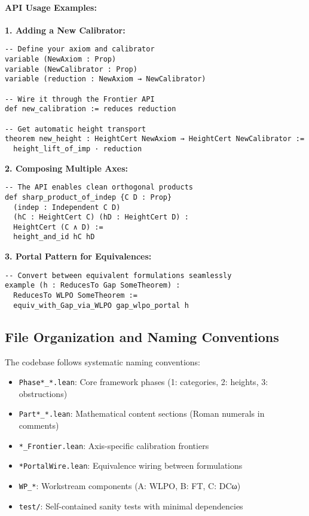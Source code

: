 \documentclass[11pt]{article}
\theoremstyle{plain}
\theoremstyle{definition}
\begin{document}
\paragraph{API Usage Examples:}

\textbf{1. Adding a New Calibrator:}
\begin{verbatim}
-- Define your axiom and calibrator
variable (NewAxiom : Prop)
variable (NewCalibrator : Prop)
variable (reduction : NewAxiom → NewCalibrator)

-- Wire it through the Frontier API
def new_calibration := reduces reduction

-- Get automatic height transport
theorem new_height : HeightCert NewAxiom → HeightCert NewCalibrator :=
  height_lift_of_imp · reduction
\end{verbatim}

\textbf{2. Composing Multiple Axes:}
\begin{verbatim}
-- The API enables clean orthogonal products
def sharp_product_of_indep {C D : Prop}
  (indep : Independent C D)
  (hC : HeightCert C) (hD : HeightCert D) :
  HeightCert (C ∧ D) := 
  height_and_id hC hD
\end{verbatim}

\textbf{3. Portal Pattern for Equivalences:}
\begin{verbatim}
-- Convert between equivalent formulations seamlessly
example (h : ReducesTo Gap SomeTheorem) : 
  ReducesTo WLPO SomeTheorem :=
  equiv_with_Gap_via_WLPO gap_wlpo_portal h
\end{verbatim}

\subsection{File Organization and Naming Conventions}

The codebase follows systematic naming conventions:
\begin{itemize}
\item \texttt{Phase*\_*.lean}: Core framework phases (1: categories, 2: heights, 3: obstructions)
\item \texttt{Part*\_*.lean}: Mathematical content sections (Roman numerals in comments)
\item \texttt{*\_Frontier.lean}: Axis-specific calibration frontiers
\item \texttt{*PortalWire.lean}: Equivalence wiring between formulations
\item \texttt{WP\_*}: Workstream components (A: WLPO, B: FT, C: DCω)
\item \texttt{test/}: Self-contained sanity tests with minimal dependencies
\end{itemize}
\end{document}
